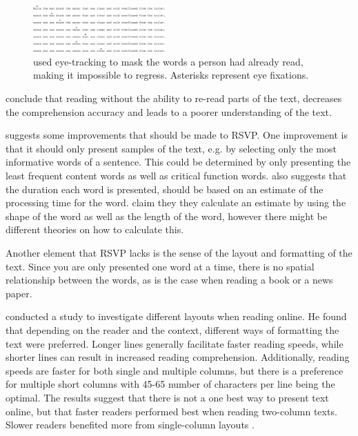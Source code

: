 \begin{figure}[htbp]
\centering
\includegraphics[width=0.45\textwidth]{Pics/trace_crosses}
\caption{\protect\citeauthor{schotter_dont_2014} used eye-tracking to mask the words a person had already read, making it impossible to regress. Asterisks represent eye fixations. \protect\cite{schotter_dont_2014}}
\label{fig:trace_cross}
\end{figure}

\citeauthor{schotter_dont_2014} conclude that reading without the ability to re-read parts of the text, decreases the comprehension accuracy and leads to a poorer understanding of the text.


 suggests some improvements that should be made to RSVP. One improvement is that it should only present samples of the text, e.g. by selecting only the most informative words of a sentence. This could be determined by only presenting the least frequent content words as well as critical function words.  also suggests that the duration each word is presented, should be based on an estimate of the processing time for the word.  claim they they calculate an estimate by using the shape of the word as well as the length of the word, however there might be different theories on how to calculate this.

Another element that RSVP lacks is the sense of the layout and formatting of the text. Since you are only presented one word at a time, there is no spatial relationship between the words, as is the case when reading a book or a news paper.

 conducted a study to investigate different layouts when reading online. He found that depending on the reader and the context, different ways of formatting the text were preferred. Longer lines generally facilitate faster reading speeds, while shorter lines can result in increased reading comprehension. Additionally, reading speeds are faster for both single and multiple columns, but there is a preference for multiple short columns with 45-65 number of characters per line being the optimal. The results suggest that there is not a one best way to present text online, but that faster readers performed best when reading two-column texts. Slower readers benefited more from single-column layouts \cite{baker_is_2005}.